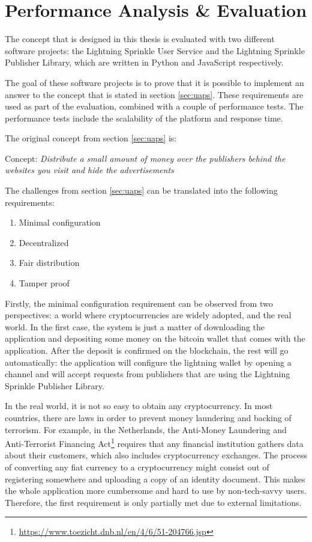 \chapter{Performance Analysis \& Evaluation}
\label{cha:evaluation}

The concept that is designed in this thesis is evaluated with two different software projects: the Lightning Sprinkle User Service and the Lightning Sprinkle Publisher Library, which are written in Python and JavaScript respectively. 

The goal of these software projects is to prove that it is possible to implement an answer to the concept that is stated in section \ref{sec:uaps}. These requirements are used as part of the evaluation, combined with a couple of performance tests. The performance tests include the scalability of the platform and response time. 

\noindent The original concept from section \ref{sec:uaps} is:

\vspace{1em}

Concept: \textit{Distribute a small amount of money over the publishers behind the websites you visit and hide the advertisements}

\vspace{1em}

\noindent The challenges from section \ref{sec:uaps} can be translated into the following requirements:
\begin{enumerate}
  \item Minimal configuration
  \item Decentralized
  \item Fair distribution
  \item Tamper proof
\end{enumerate}

Firstly, the minimal configuration requirement can be observed from two perspectives: a world where cryptocurrencies are widely adopted, and the real world. In the first case, the system is just a matter of downloading the application and depositing some money on the bitcoin wallet that comes with the application. After the deposit is confirmed on the blockchain, the rest will go automatically: the application will configure the lightning wallet by opening a channel and will accept requests from publishers that are using the Lightning Sprinkle Publisher Library. 

In the real world, it is not so easy to obtain any cryptocurrency. In most countries, there are laws in order to prevent money laundering and backing of terrorism. For example, in the Netherlands, the Anti-Money Laundering and Anti-Terrorist Financing Act\footnote{\url{https://www.toezicht.dnb.nl/en/4/6/51-204766.jsp}} requires that any financial institution gathers data about their customers, which also includes cryptocurrency exchanges. The process of converting any fiat currency to a cryptocurrency might consist out of registering somewhere and uploading a copy of an identity document. This makes the whole application more cumbersome and hard to use by non-tech-savvy users. Therefore, the first requirement is only partially met due to external limitations.

